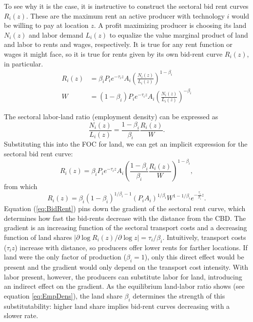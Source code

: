 \documentclass[12pt]{article}
\begin{document}
To see why it is the case, it is instructive to construct the sectoral bid rent curves $R_i(z)$. These are the maximum rent an active producer with technology $i$ would be willing to pay at location $z$. %
A profit maximizing producer is choosing its land $N_i(z)$ and labor demand $L_i(z)$ to equalize the value marginal product of land and labor to rents and wages, respectively. It is true for any rent function or wages it might face, so it is true for rents given by its own bid-rent curve $R_i(z)$, in particular.
\begin{align}
R_i(z) &=\beta_i P_ie^{-\tau_i z}A_i \left(\frac{N_i(z)}{L_i(z)}\right)^{1-\beta_i}\\
W &=(1-\beta_i) P_ie^{-\tau_i z}A_i \left(\frac{N_i(z)}{L_i(z)}\right)^{-\beta_i}
\end{align}

The sectoral labor-land ratio (employment density) can be expressed as
\begin{equation}
\label{eq:EmpDens}
\frac{N_i(z)}{L_i(z)} = \frac{1-\beta_i}{\beta_i}\frac{R_i(z)}{W}.
\end{equation}
Substituting this into the FOC for land, we can get an implicit expression for the sectoral bid rent curve:
\[
R_i(z) =\beta_i P_ie^{-\tau_i z}A_i \left(\frac{1-\beta_i}{\beta_i}\frac{R_i(z)}{W}\right)^{1-\beta_i},
\]
from which
\begin{equation}
\label{eq:BidRent}
R_i(z) =\beta_i(1-\beta_i)^{1/\beta_i-1} (P_iA_i)^{1/\beta_i} W^{1-1/\beta_i} e^{-\frac{\tau_i}{\beta_i} z}.
\end{equation}
Equation (\ref{eq:BidRent}) pins down the gradient of the sectoral rent curve, which determines how fast the bid-rents decrease with the distance from the CBD. The gradient is an increasing function of the sectoral transport costs and a decreasing function of land shares $|\partial\log R_i(z)/\partial \log z|=\tau_i/\beta_i$. Intuitively, transport costs ($\tau_iz$) increase with distance, so producers offer lower rents for farther locations. If land were the only factor of production ($\beta_i=1$), only this direct effect would be present and the gradient would only depend on the transport cost intensity. With labor present, however, the producers can substitute labor for land, introducing an indirect effect on the gradient. As the equilibrium land-labor ratio shows (see equation \ref{eq:EmpDens}), the land share $\beta_i$ determines the strength of this substitutability: higher land share implies bid-rent curves decreasing with a slower rate.
\end{document}

